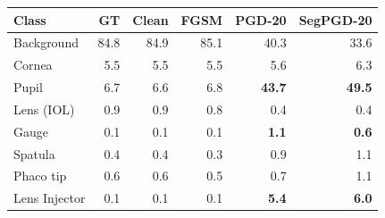 \begin{tabular}{@{}lrrrrr@{}}
\toprule
Class & GT & Clean & FGSM & PGD-20 & SegPGD-20 \\
\midrule
Background & 84.8 & 84.9 & 85.1 & 40.3 & 33.6 \\
Cornea & 5.5 & 5.5 & 5.5 & 5.6 & 6.3 \\
Pupil & 6.7 & 6.6 & 6.8 & \textbf{43.7} & \textbf{49.5} \\
Lens (IOL) & 0.9 & 0.9 & 0.8 & 0.4 & 0.4 \\
Gauge & 0.1 & 0.1 & 0.1 & \textbf{1.1} & \textbf{0.6} \\
Spatula & 0.4 & 0.4 & 0.3 & 0.9 & 1.1 \\
Phaco tip & 0.6 & 0.6 & 0.5 & 0.7 & 1.1 \\
Lens Injector & 0.1 & 0.1 & 0.1 & \textbf{5.4} & \textbf{6.0} \\
\bottomrule
\end{tabular}
